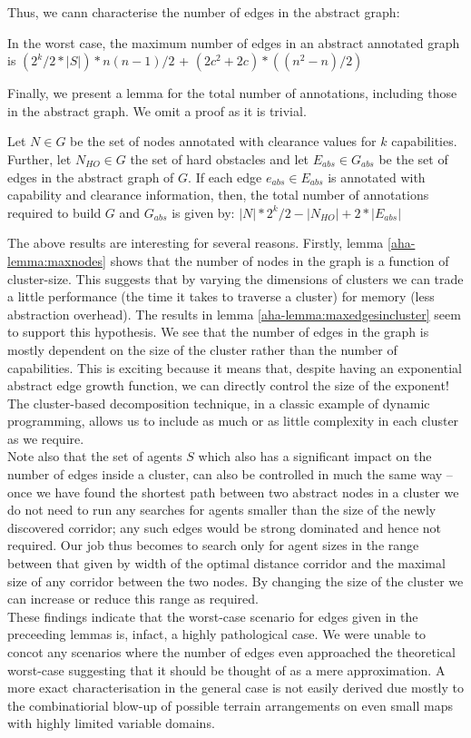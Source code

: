 Thus, we cann characterise the number of edges in the abstract graph:
\begin{lemma}
In the worst case, the maximum number of edges in an abstract annotated graph is $(2^k/2 * |S|) * n(n-1)/2$ + $(2c^2 + 2c)*((n^2-n)/2)$
\end{lemma}
\medskip
Finally, we present a lemma for the total number of annotations, including those in the abstract graph. We omit a proof as it is trivial.
\begin{lemma}
\label{aha-lemma:totalannotations}
Let $N \in G$ be the set of nodes annotated with clearance values for $k$ capabilities. Further, let $N_{HO} \in G$ the set of hard obstacles and let $E_{abs} \in G_{abs}$ be the set of edges in the abstract graph of $G$. If each edge $e_{abs} \in E_{abs}$ is annotated with capability and clearance information, then, the total number of annotations required to build $G$ and $G_{abs}$ is given by: 
$|N|*2^k/2 - |N_{HO}| + 2*|E_{abs}|$
\end{lemma}
\medskip
The above results are interesting for several reasons. 
Firstly, lemma \ref{aha-lemma:maxnodes} shows that the number of nodes in the graph is a function of cluster-size. This suggests that by varying the dimensions of clusters we can trade a little performance (the time it takes to traverse a cluster) for memory (less abstraction overhead).
The results in lemma \ref{aha-lemma:maxedgesincluster} seem to support this hypothesis. We see that the number of edges in the graph is mostly dependent on the size of the cluster rather than the number of capabilities. 
This is exciting because it means that, despite having an exponential abstract edge growth function, we can directly control the size of the exponent! The cluster-based decomposition technique, in a classic example of dynamic programming, allows us to include as much or as little complexity in each cluster as we require.\\ \newline
Note also that the set of agents $S$ which also has a significant impact on the number of edges inside a cluster, can also be controlled in much the same way -- once we have found the shortest path between two abstract nodes in a cluster we do not need to run any searches for agents smaller than the size of the newly discovered corridor; any such edges would be strong dominated and hence not required. Our job thus becomes to search only for agent sizes in the range between that given by width of the optimal distance corridor and the maximal size of any corridor between the two nodes. By changing the size of the cluster we can increase or reduce this range as required.\\ 
These findings indicate that the worst-case scenario for edges given in the preceeding lemmas is, infact, a highly pathological case. We were unable to concot any scenarios where the number of edges even approached the theoretical worst-case suggesting that it should be thought of as a mere approximation. A more exact characterisation in the general case is not easily derived due mostly to the combinatiorial blow-up of possible terrain arrangements on even small maps with highly limited variable domains.

